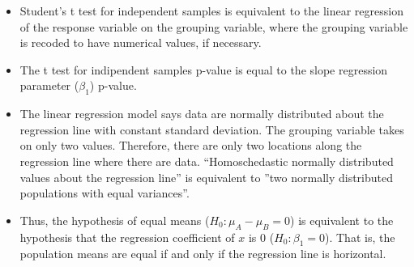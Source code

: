 
\begin{frame}
  \begin{itemize}
    \vspace{0.75cm}
    \item Student's t test for independent samples is equivalent to the linear regression of the response variable on the grouping variable, where the grouping variable is recoded to have numerical values, if necessary.
    \vspace{0.75cm}
    \item The t test for indipendent samples p-value is equal to the slope regression parameter ($ \beta_1 $) p-value.
  \end{itemize}
\end{frame}

\begin{frame}
  \begin{itemize}
    \vspace{0.5cm}
    \item The linear regression model says data are normally distributed about the regression line with constant standard deviation. The grouping variable takes on only two values. Therefore, there are only two locations along the regression line where there are data. ``Homoschedastic normally distributed values about the regression line'' is equivalent to ''two normally distributed populations with equal variances''.
    \vspace{0.5cm}
    \item Thus, the hypothesis of equal means ($ H_0: \mu_A - \mu_B = 0 $) is equivalent to the hypothesis that the regression coefficient of $ x $ is 0 ($ H_0: \beta_1 = 0 $). That is, the population means are equal if and only if the regression line is horizontal.
  \end{itemize}
\end{frame}

